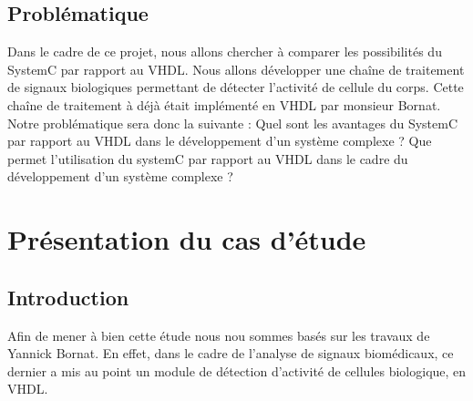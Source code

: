 \documentclass[a4paper,12pt]{article}
\begin{document}


\subsection{Problématique}

Dans le cadre de ce projet, nous allons chercher à comparer les possibilités du SystemC par rapport au VHDL. Nous allons développer une chaîne de traitement de signaux biologiques permettant de détecter l'activité de cellule du corps. Cette chaîne de traitement à déjà était implémenté en VHDL par monsieur Bornat. \newline
Notre problématique sera donc la suivante : Quel sont les avantages du SystemC par rapport au VHDL dans le développement d'un système complexe ?  
Que permet l’utilisation du systemC par rapport au VHDL dans le cadre du développement d’un système complexe ? 
\newpage
\section{Présentation du cas d'étude}
\subsection{Introduction}
Afin de mener à bien cette étude nous nou sommes basés sur les travaux de Yannick Bornat. En effet, dans le cadre de l'analyse de signaux biomédicaux, ce dernier a mis au point un module de détection d'activité de cellules biologique, en VHDL.\\
\end{document}

